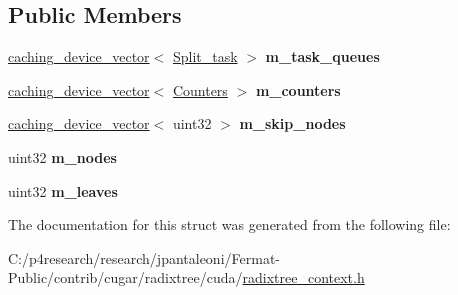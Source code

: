 \subsection*{Public Members}
\begin{DoxyCompactItemize}
\item 
\mbox{\label{structcugar_1_1cuda_1_1_radixtree__context_a4866d0000f001392aa5cff2fca423f8e}} 
\hyperlink{structcugar_1_1caching__device__vector}{caching\+\_\+device\+\_\+vector}$<$ \hyperlink{structcugar_1_1cuda_1_1_radixtree__context_1_1_split__task}{Split\+\_\+task} $>$ {\bfseries m\+\_\+task\+\_\+queues}
\item 
\mbox{\label{structcugar_1_1cuda_1_1_radixtree__context_a65b1c2a3cdad482052474df9cc95b15e}} 
\hyperlink{structcugar_1_1caching__device__vector}{caching\+\_\+device\+\_\+vector}$<$ \hyperlink{structcugar_1_1cuda_1_1_radixtree__context_1_1_counters}{Counters} $>$ {\bfseries m\+\_\+counters}
\item 
\mbox{\label{structcugar_1_1cuda_1_1_radixtree__context_a18b7703669e9653ec2f96b4c8a205542}} 
\hyperlink{structcugar_1_1caching__device__vector}{caching\+\_\+device\+\_\+vector}$<$ uint32 $>$ {\bfseries m\+\_\+skip\+\_\+nodes}
\item 
\mbox{\label{structcugar_1_1cuda_1_1_radixtree__context_a52d41922e9882d3f3b38798651ea4aaf}} 
uint32 {\bfseries m\+\_\+nodes}
\item 
\mbox{\label{structcugar_1_1cuda_1_1_radixtree__context_a81cae97d36a216c53b092be4966158f3}} 
uint32 {\bfseries m\+\_\+leaves}
\end{DoxyCompactItemize}


The documentation for this struct was generated from the following file\+:\begin{DoxyCompactItemize}
\item 
C\+:/p4research/research/jpantaleoni/\+Fermat-\/\+Public/contrib/cugar/radixtree/cuda/\hyperlink{radixtree__context_8h}{radixtree\+\_\+context.\+h}\end{DoxyCompactItemize}
